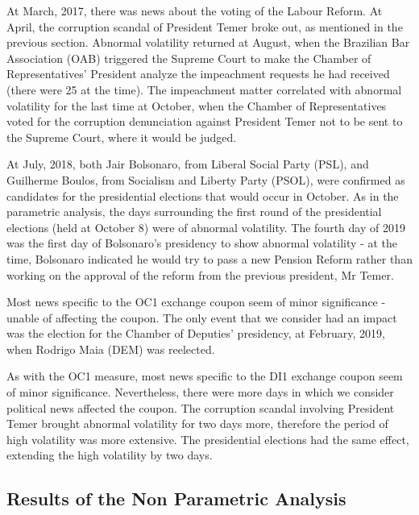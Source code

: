 \documentclass[cic,tc, english]{iiufrgs}
\begin{document}
   
   
   At March, 2017, there was news about the voting of the Labour Reform. At April, the corruption scandal of President Temer broke out, as mentioned in the previous section. Abnormal volatility returned at August, when the Brazilian Bar Association (OAB) triggered the Supreme Court to make the Chamber of Representatives' President analyze the impeachment requests he had received (there were 25 at the time). The impeachment matter correlated with abnormal volatility for the last time at October, when the Chamber of Representatives voted for the corruption denunciation against President Temer not to be sent to the Supreme Court, where it would be judged.
    
    At July, 2018, both Jair Bolsonaro, from Liberal Social Party (PSL), and Guilherme Boulos, from Socialism and Liberty Party (PSOL), were confirmed as candidates for the presidential elections that would occur in October. As in the parametric analysis, the days surrounding the first round of the presidential elections (held at October 8) were of abnormal volatility. The fourth day of 2019 was the first day of Bolsonaro's presidency to show abnormal volatility - at the time, Bolsonaro indicated he would try to pass a new Pension Reform rather than working on the approval of the reform from the previous president, Mr Temer. 
    
    
    
    Most news specific to the OC1 exchange coupon seem of minor significance - unable of affecting the coupon. The only event that we consider had an impact was the election for the Chamber of Deputies' presidency, at February, 2019, when Rodrigo Maia (DEM) was reelected.
    
    
    
    As with the OC1 measure, most news specific to the DI1 exchange coupon seem of minor significance. Nevertheless, there were more days in which we consider political news affected the coupon. 
    The corruption scandal involving President Temer brought abnormal volatility for two days more, therefore the period of high volatility was more extensive. The presidential elections had the same effect, extending the high volatility by two days.

\subsection{Results of the Non Parametric Analysis}
\end{document}

